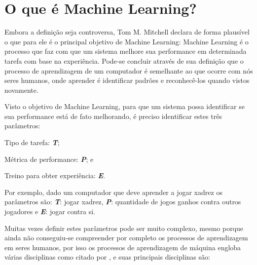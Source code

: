 \section{O que é Machine Learning?}
\label{sec:oqueemachinelearning}

Embora a definição seja controversa, Tom M. Mitchell declara de forma plausível o que para ele é o principal objetivo de Machine Learning: Machine Learning é o processo que faz com que um sistema melhore
sua performance em determinada tarefa com base na experiência\cite{Tom}. Pode-se concluir através de sua definição que o processo de aprendizagem de um 
computador é semelhante ao que ocorre com nós seres humanos, onde aprender é identificar padrões e reconhecê-los quando vistos novamente.

Visto o objetivo de Machine Learning, para que um sistema possa identificar se sua performance está de fato melhorando, é preciso identificar estes três parâmetros:
 \begin{alineas}
	\item Tipo de tarefa: \textbf{\textit{T}};
	
	
	\item Métrica de performance: \textbf{\textit{P}}; e
	
	
	\item Treino para obter experiência: \textbf{\textit{E}}.			
\end{alineas}
Por exemplo, dado um computador que deve aprender a jogar xadrez os parâmetros são: \textbf{\textit{T}}: jogar xadrez, \textbf{\textit{P}}: quantidade de jogos ganhos contra outros jogadores e
\textbf{\textit{E}}: jogar contra si.

Muitas vezes definir estes parâmetros pode ser muito complexo, mesmo porque ainda não conseguiu-se compreender por completo os processos
de aprendizagem em seres humanos, por isso os processos de aprendizagem de máquina engloba várias disciplinas como citado por \cite{Tom}, e suas principais disciplinas são: 
 

